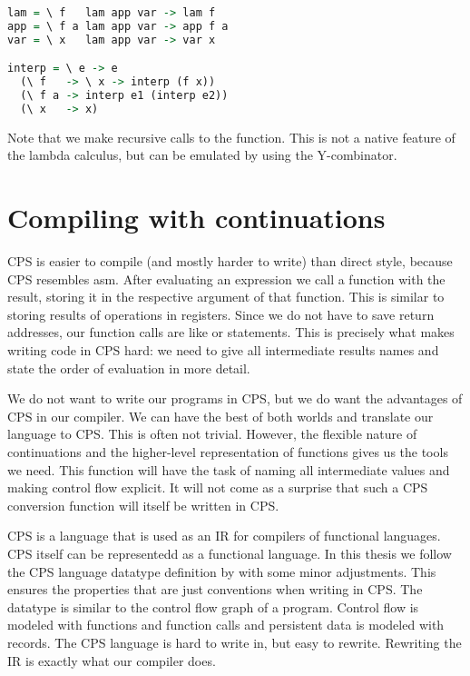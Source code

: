 \begin{lstlisting}[language=Haskell]
lam = \ f   lam app var -> lam f
app = \ f a lam app var -> app f a
var = \ x   lam app var -> var x

interp = \ e -> e 
  (\ f   -> \ x -> interp (f x))
  (\ f a -> interp e1 (interp e2))
  (\ x   -> x)
\end{lstlisting}

Note that we make recursive calls to the  function. This is not a native feature of the lambda calculus, but can be emulated by using the Y-combinator\autocite{barendregt1984lambda}.

\section{\label{section:cwc}Compiling with continuations}
\ac{CPS} is easier to compile (and mostly harder to write) than direct style, because \ac{CPS} resembles \ac{asm}. After evaluating an expression we call a function with the result, storing it in the respective argument of that function. This is similar to storing results of operations in registers. Since we do not have to save return addresses, our function calls are like  or  statements. This is precisely what makes writing code in \ac{CPS} hard: we need to give all intermediate results names and state the order of evaluation in more detail.

We do not want to write our programs in \ac{CPS}, but we do want the advantages of \ac{CPS} in our compiler. We can have the best of both worlds and translate our language to \ac{CPS}. This is often not trivial. However, the flexible nature of continuations and the higher-level representation of functions gives us the tools we need. This function will have the task of naming all intermediate values and making control flow explicit. It will not come as a surprise that such a \ac{CPS} conversion function will itself be written in \ac{CPS}.

\ac{CPS} is a language that is used as an \ac{IR} for compilers of functional languages\autocite{steele1978rabbit, DBLP:books/daglib/0022396}. \ac{CPS} itself can be representedd as a functional language. In this thesis we follow the \ac{CPS} language datatype definition by \citeauthor{DBLP:books/daglib/0022396} with some minor adjustments. This ensures the properties that are just conventions when writing in \ac{CPS}. The datatype is similar to the control flow graph of a program. Control flow is modeled with functions and function calls and persistent data is modeled with records. The \ac{CPS} language is hard to write in, but easy to rewrite. Rewriting the \ac{IR} is exactly what our compiler does.

